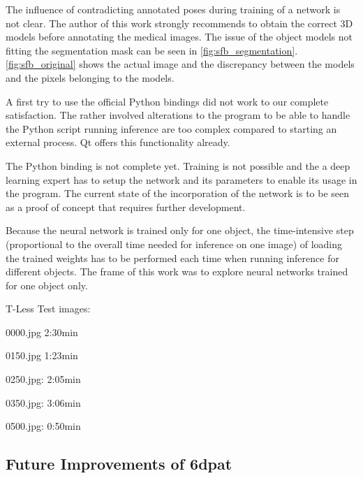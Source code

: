 The influence of contradicting annotated poses during training of a network is not clear. The author of this work strongly recommends to obtain the correct 3D models before annotating the medical images. The issue of the object models not fitting the segmentation mask can be seen in \fig \ref{fig:sfb_segmentation}. \fig \ref{fig:sfb_original} shows the actual image and the discrepancy between the models and the pixels belonging to the models.

A first try to use the official Python bindings did not work to our complete satisfaction. The rather involved alterations to the program to be able to handle the Python script running inference are too complex compared to starting an external process. Qt offers this functionality already.

The Python binding is not complete yet. Training is not possible and the a deep learning expert has to setup the network and its parameters to enable its usage in the program. The current state of the incorporation of the network is to be seen as a proof of concept that requires further development.

Because the neural network is trained only for one object, the time-intensive step (proportional to the overall time needed for inference on one image) of loading the trained weights has to be performed each time when running inference for different objects. The frame of this work was to explore neural networks trained for one object only.
















T-Less Test images:

0000.jpg 2:30min

0150.jpg 1:23min

0250.jpg: 2:05min

0350.jpg: 3:06min

0500.jpg: 0:50min













\subsection{Future Improvements of \gls{6dpat}}

